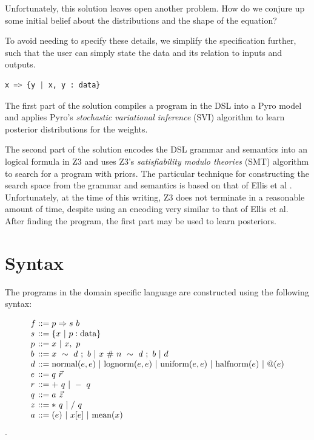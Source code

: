 \documentclass[runningheads]{llncs}
\begin{document}
Unfortunately, this solution leaves open another problem. How do we conjure up some 
initial belief about the distributions and the shape of the equation? 

To avoid needing to specify these details, we simplify the specification further, such that the 
user can simply state the data and its relation to inputs and outputs. 

\begin{lstlisting}[language=Python]
x => {y | x, y : data}
\end{lstlisting}

The first part of the solution compiles a program in the DSL into a Pyro model and applies Pyro's 
\textit{stochastic variational inference} (SVI) algorithm \cite{} to learn posterior distributions for the weights. 

The second part of the solution encodes the DSL grammar and semantics into
an logical formula in Z3 \cite{} and uses Z3's \textit{satisfiability modulo theories} (SMT) \cite{} algorithm to search
for a program with priors.  
The particular technique for constructing the search space from the grammar and semantics 
is based on that of Ellis et al \cite{}.
Unfortunately, at the time of this writing, Z3 does not terminate in a reasonable amount of time, 
despite using an encoding very similar to that of Ellis et al. 
After finding the program, the first part may be used to learn posteriors. 

\section{Syntax}
The programs in the domain specific language are constructed using the following syntax:

\[
  \begin{array}{l @{} l}
    f &{} ::= p \Rightarrow s\ b \\
    s &{} ::= \{ x \ |\ p : \text{data} \} \\
    p &{} ::= x  \ |\ x,\ p \\
    b &{} ::= x\ \sim\ d\ ;\ b \ |\ x\ \#\ n\ \sim\ d\ ;\ b \ |\ d \\ 
    d &{} ::= 
        \text{normal}(e, e) \ |\ 
        \text{lognorm}(e, e) \ |\ 
        \text{uniform}(e, e) \ |\ 
        \text{halfnorm}(e) \ |\ 
        @(e) \\ 
    e &{} ::= q\ \vec{r} \\
    r &{} ::= +\ q \ |\ -\ q \\
    q &{} ::= a\ \vec{z} \\
    z &{} ::= *\ q \ |\ /\ q \\
    a &{} ::= (e) \ |\ x[e] \ |\ \text{mean}(x) \\
  \end{array}
\]
.
\end{document}
